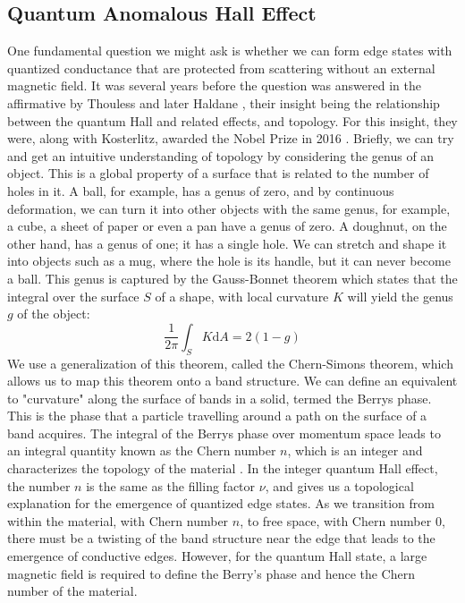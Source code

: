 \subsection{Quantum Anomalous Hall Effect}
One fundamental question we might ask is whether we can form edge states with quantized conductance that are protected from
scattering without an external magnetic field. It was several years before the question was answered in the affirmative by
Thouless \cite{PhysRevLett.49.405} and later Haldane \cite{PhysRevLett.61.2015}, their insight being the relationship between the
quantum Hall and related effects, and topology. For this insight, they were, along with Kosterlitz, awarded the Nobel Prize in 2016 \cite{nobel2016}.
Briefly, we can try and get an intuitive understanding of topology by considering the genus of an object. This is a global property of
a surface that is related to the number of holes in it. A ball, for example, has a genus of zero, and by continuous deformation, we can turn it
into other objects with the same genus, for example, a cube, a sheet of paper or even a pan have a genus of zero. A doughnut, on the other hand, has
a genus of one; it has a single hole. We can stretch and shape it into objects such as a mug, where the hole is its handle, but it can never become a ball.
This genus is captured by the Gauss-Bonnet theorem which states that the integral over the surface $S$ of a shape, with local curvature $K$ will yield
the genus $g$ of the object:
\begin{equation}
  \frac{1}{2\pi}\int_S K \mathrm{d}A = 2(1-g)
\end{equation}
We use a generalization of this theorem, called the Chern-Simons theorem, which allows us to map this theorem onto a band structure. We can define an
equivalent to "curvature" along the surface of bands in a solid, termed the Berrys phase. This is the phase that a particle travelling around
a path on the surface of a band acquires. The integral of the Berrys phase over momentum space leads to an integral quantity known as the Chern number
$n$, which is an integer and characterizes the topology of the material \cite{conmatphys-011417}. In the integer quantum Hall effect, the number $n$ is the same as the filling factor $\nu$, and gives us a topological explanation for the emergence of quantized edge states. As we transition from within
the material, with Chern number $n$, to free space, with Chern number $0$, there must be a twisting of the band structure near the edge that leads to the emergence of conductive edges. However, for the quantum Hall state, a large magnetic field is required to define the Berry's phase and hence the Chern number of the material.

